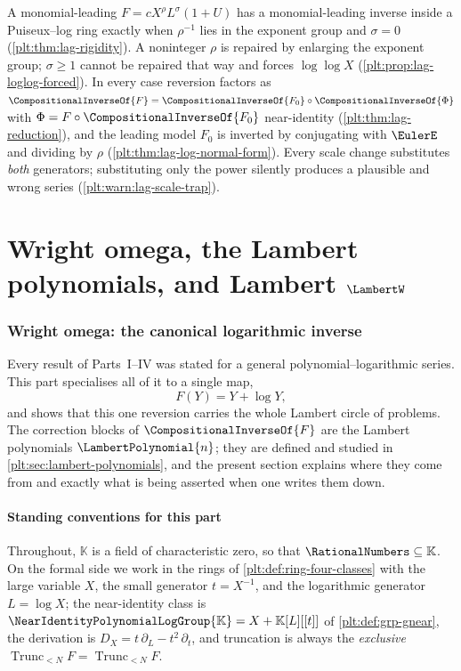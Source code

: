 \documentclass[11pt,oneside]{article}
\theoremstyle{plain}
\theoremstyle{definition}
\theoremstyle{remark}
\newcommand{\K}{\mathbb{K}}
\newcommand{\Gnear}{\NearIdentityPolynomialLogGroup{\K}} %
\newcommand{\Trunc}[2]{\operatorname{Trunc}_{<#2}#1}     %
\newcommand{\DX}{D_{X}}                                  %
\newcommand{\compose}{\mathbin{\circ}}
\newcommand{\rev}[1]{\CompositionalInverseOf{#1}}
\newcommand{\LamP}[1]{\LambertPolynomial{#1}}
\begin{document}
\begin{summarybox}[title={Beyond the identity scale}]
A monomial-leading \(F=cX^{\rho}L^{\sigma}(1+U)\) has a monomial-leading
inverse inside a Puiseux--log ring exactly when \(\rho^{-1}\) lies in the
exponent group and \(\sigma=0\)
(\cref{plt:thm:lag-rigidity}).  A noninteger \(\rho\) is repaired by enlarging
the exponent group; \(\sigma\ge1\) cannot be repaired that way and forces
\(\log\log X\) (\cref{plt:prop:lag-loglog-forced}).  In every case reversion
factors as \(\rev{F}=\rev{F_0}\compose\rev{\Phi}\) with
\(\Phi=F\compose\rev{F_0}\) near-identity
(\cref{plt:thm:lag-reduction}), and the leading model \(F_0\) is inverted by
conjugating with \(\EulerE\) and dividing by \(\rho\)
(\cref{plt:thm:lag-log-normal-form}).  Every scale change substitutes
\emph{both} generators; substituting only the power silently produces a
plausible and wrong series (\cref{plt:warn:lag-scale-trap}).
\end{summarybox}

\clearpage
\part{Wright omega, the Lambert polynomials, and Lambert \texorpdfstring{\(\LambertW\)}{W}}

\section{Wright omega: the canonical logarithmic inverse}
\label{plt:sec:wright-omega}

Every result of Parts~I--IV was stated for a general polynomial--logarithmic
series.  This part specialises all of it to a single map,
\[
 F(Y)=Y+\log Y,
\]
and shows that this one reversion carries the whole Lambert circle of
problems.  The correction blocks of \(\rev{F}\) are the Lambert polynomials
\(\LamP{n}\); they are defined and studied in
\cref{plt:sec:lambert-polynomials}, and the present section explains where
they come from and exactly what is being asserted when one writes them down.

\subsection{Standing conventions for this part}
\label{plt:sec:om-conventions}

Throughout, \(\K\) is a field of characteristic zero, so that
\(\RationalNumbers\subseteq\K\).  On the formal side we work in the rings of
\cref{plt:def:ring-four-classes} with the large variable \(X\), the small generator
\(t=X^{-1}\), and the logarithmic generator \(L=\log X\); the near-identity
class is \(\Gnear=X+\K[L][[t]]\) of \cref{plt:def:grp-gnear}, the derivation is
\(\DX=t\,\partial_L-t^2\,\partial_t\), and truncation is always the
\emph{exclusive} \(\Trunc{F}{N}=\operatorname{Trunc}_{<N}F\).
\end{document}
